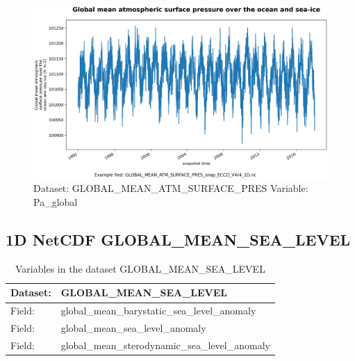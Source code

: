 \begin{figure}[H]
\centering
\includegraphics[scale=0.55]{../images/plots/oneD_plots/Global_Mean_Atmospheric_Pressure/Pa_global.png}
\caption{Dataset: GLOBAL\_MEAN\_ATM\_SURFACE\_PRES Variable: Pa\_global}
\label{tab:table-GLOBAL_MEAN_ATM_SURFACE_PRES_Pa_global-Plot}
\end{figure}
\pagebreak
\subsection{1D NetCDF GLOBAL\_MEAN\_SEA\_LEVEL}
\newp
\begin{longtable}{|p{}|p{}|}
\caption{Variables in the dataset GLOBAL\_MEAN\_SEA\_LEVEL}
\label{tab:table-GLOBAL_MEAN_SEA_LEVEL-fields} \\ 
\hline \endhead \hline \endfoot
\rowcolor{lightgray} \textbf{Dataset:} & \textbf{GLOBAL\_MEAN\_SEA\_LEVEL} \\ \hline
Field: &global\_mean\_barystatic\_sea\_level\_anomaly \\ \hline
Field: &global\_mean\_sea\_level\_anomaly \\ \hline
Field: &global\_mean\_sterodynamic\_sea\_level\_anomaly \\ \hline
\end{longtable}

\pagebreak
